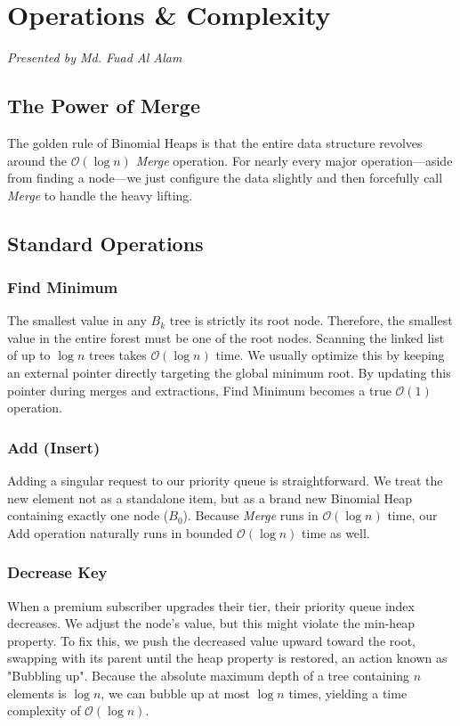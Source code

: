 \documentclass[11pt, a4paper]{report}
\begin{document}
\chapter{Operations \& Complexity}
\textit{Presented by Md. Fuad Al Alam}

\section{The Power of Merge}
The golden rule of Binomial Heaps is that the entire data structure revolves around the $\mathcal{O}(\log n)$ \textit{Merge} operation. For nearly every major operation—aside from finding a node—we just configure the data slightly and then forcefully call \textit{Merge} to handle the heavy lifting.

\section{Standard Operations}

\subsection{Find Minimum}
The smallest value in any $B_k$ tree is strictly its root node. Therefore, the smallest value in the entire forest must be one of the root nodes. Scanning the linked list of up to $\log n$ trees takes $\mathcal{O}(\log n)$ time. We usually optimize this by keeping an external pointer directly targeting the global minimum root. By updating this pointer during merges and extractions, Find Minimum becomes a true $\mathcal{O}(1)$ operation.

\subsection{Add (Insert)}
Adding a singular request to our priority queue is straightforward. We treat the new element not as a standalone item, but as a brand new Binomial Heap containing exactly one node ($B_0$). Because \textit{Merge} runs in $\mathcal{O}(\log n)$ time, our Add operation naturally runs in bounded $\mathcal{O}(\log n)$ time as well.

\subsection{Decrease Key}
When a premium subscriber upgrades their tier, their priority queue index decreases. We adjust the node's value, but this might violate the min-heap property. To fix this, we push the decreased value upward toward the root, swapping with its parent until the heap property is restored, an action known as "Bubbling up". Because the absolute maximum depth of a tree containing $n$ elements is $\log n$, we can bubble up at most $\log n$ times, yielding a time complexity of $\mathcal{O}(\log n)$.
\end{document}

